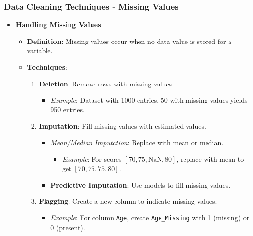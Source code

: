 \documentclass{beamer}
\begin{document}
\begin{frame}[fragile]
    \frametitle{Data Cleaning Techniques - Missing Values}
    \begin{itemize}
        \item \textbf{Handling Missing Values}
        \begin{itemize}
            \item \textbf{Definition}: Missing values occur when no data value is stored for a variable.
            \item \textbf{Techniques}:
            \begin{enumerate}
                \item \textbf{Deletion}: Remove rows with missing values.
                \begin{itemize}
                    \item \textit{Example}: Dataset with 1000 entries, 50 with missing values yields 950 entries.
                \end{itemize}
                \item \textbf{Imputation}: Fill missing values with estimated values.
                \begin{itemize}
                    \item \textit{Mean/Median Imputation}: Replace with mean or median.
                    \begin{itemize}
                        \item \textit{Example}: For scores \([70, 75, \text{NaN}, 80]\), replace with mean to get \([70, 75, 75, 80]\).
                    \end{itemize}
                    \item \textbf{Predictive Imputation}: Use models to fill missing values.
                \end{itemize}
                \item \textbf{Flagging}: Create a new column to indicate missing values.
                \begin{itemize}
                    \item \textit{Example}: For column \texttt{Age}, create \texttt{Age\_Missing} with 1 (missing) or 0 (present).
                \end{itemize}
            \end{enumerate}
        \end{itemize}
    \end{itemize}
\end{frame}
\end{document}
